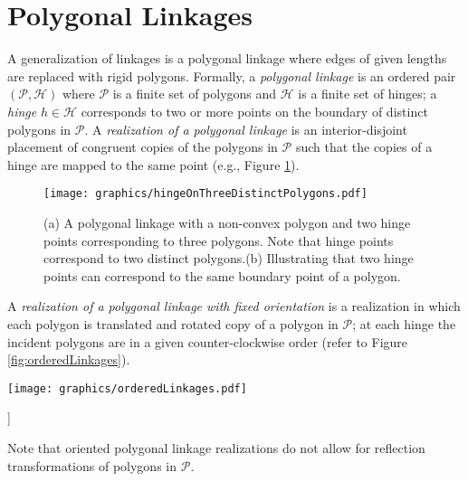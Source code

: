 \documentclass[10pt]{CSUNthesis}
\theoremstyle{plain}%
\theoremstyle{definition}
\theoremstyle{remark}
\newcommand{\HH}{{\mathcal{H}}} %
\renewcommand{\PP}{{\mathcal{P}}} %
\begin{document}
\section{Polygonal Linkages}\label{sec:hinge}
A generalization of linkages is a polygonal linkage where edges of given lengths are replaced with rigid polygons.
Formally, a \textit{polygonal linkage} is an ordered pair $\left(\PP,\HH \right)$ where $\PP$ is a finite set of polygons and $\HH$ is a finite set of hinges; a \textit{hinge} $h\in \HH$ corresponds to two or more points on the boundary of distinct polygons in $\PP$.  
A \emph{realization of a polygonal linkage} is an interior-disjoint placement of congruent copies of the polygons in $\PP$ such that the copies of a hinge are mapped to the same point (e.g., Figure \ref{fig:linkage-1}).  
\begin{figure}[!htbp]
\begin{center}
\texttt{[image: graphics/hingeOnThreeDistinctPolygons.pdf]}
\end{center} 
\caption{(a) A polygonal linkage with a non-convex polygon and two hinge points corresponding to 
three polygons.  Note that hinge points correspond to two distinct polygons.(b) Illustrating that 
two hinge points can correspond to the same boundary point of a polygon.}
\label{fig:linkage-1}
\end{figure}
A \textit{realization of a polygonal linkage with fixed orientation} is a realization in which each polygon is translated and rotated copy of a polygon in $\PP$; at each hinge the incident polygons are in a given counter-clockwise order (refer to Figure \ref{fig:orderedLinkages}).

\begin{minipage}{\linewidth}
\begin{center}
\texttt{[image: graphics/orderedLinkages.pdf]}
\label{fig:orderedLinkages}
\end{center}]
\end{minipage}

Note that oriented polygonal linkage realizations do not allow for reflection transformations of polygons in $\PP$.
\end{document}
